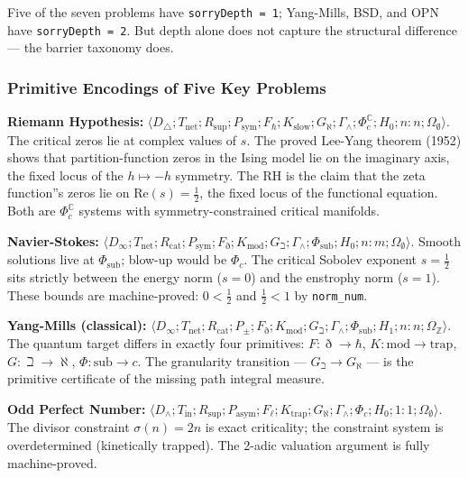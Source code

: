 \documentclass[12pt,a4paper]{article}
\begin{document}
Five of the seven problems have \texttt{sorryDepth = 1}; Yang-Mills, BSD, and OPN have \texttt{sorryDepth = 2}. But depth alone does not capture the structural difference --- the barrier taxonomy does.

\subsubsection{Primitive Encodings of Five Key Problems}

\textbf{Riemann Hypothesis:} $\langle D_{\triangle}; T_\text{net}; R_\text{sup}; P_\text{sym}; F_{\hbar}; K_\text{slow}; G_{\aleph}; \Gamma_{\wedge}; \Phi_c^\mathbb{C}; H_0; n{:}n; \Omega_{\emptyset} \rangle$. The critical zeros lie at complex values of $s$. The proved Lee-Yang theorem (1952) shows that partition-function zeros in the Ising model lie on the imaginary axis, the fixed locus of the $h \mapsto -h$ symmetry. The RH is the claim that the zeta function''s zeros lie on $\text{Re}(s) = \frac{1}{2}$, the fixed locus of the functional equation. Both are $\Phi_c^\mathbb{C}$ systems with symmetry-constrained critical manifolds.

\textbf{Navier-Stokes:} $\langle D_{\infty}; T_\text{net}; R_\text{cat}; P_\text{sym}; F_{\eth}; K_\text{mod}; G_{\beth}; \Gamma_{\wedge}; \Phi_\text{sub}; H_0; n{:}m; \Omega_{\emptyset} \rangle$. Smooth solutions live at $\Phi_\text{sub}$; blow-up would be $\Phi_c$. The critical Sobolev exponent $s = \frac{1}{2}$ sits strictly between the energy norm ($s = 0$) and the enstrophy norm ($s = 1$). These bounds are machine-proved: $0 < \frac{1}{2}$ and $\frac{1}{2} < 1$ by \texttt{norm\_num}.

\textbf{Yang-Mills (classical):} $\langle D_{\infty}; T_\text{net}; R_\text{cat}; P_{\pm}; F_{\eth}; K_\text{mod}; G_{\beth}; \Gamma_{\wedge}; \Phi_\text{sub}; H_1; n{:}n; \Omega_\mathbb{Z} \rangle$. The quantum target differs in exactly four primitives: $F: \eth \to \hbar$, $K: \text{mod} \to \text{trap}$, $G: \beth \to \aleph$, $\Phi: \text{sub} \to c$. The granularity transition --- $G_{\beth} \to G_{\aleph}$ --- is the primitive certificate of the missing path integral measure.

\textbf{Odd Perfect Number:} $\langle D_{\wedge}; T_\text{in}; R_\text{sup}; P_\text{asym}; F_{\ell}; K_\text{trap}; G_{\aleph}; \Gamma_{\wedge}; \Phi_c; H_0; 1{:}1; \Omega_{\emptyset} \rangle$. The divisor constraint $\sigma(n) = 2n$ is exact criticality; the constraint system is overdetermined (kinetically trapped). The 2-adic valuation argument is fully machine-proved.
\end{document}
